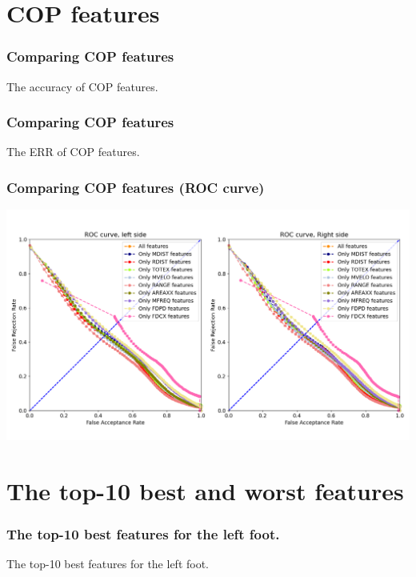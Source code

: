 \documentclass{beamer}
\begin{document}
\section{COP features}


\begin{frame}
\frametitle{Comparing COP features}
\tiny
\begin{table}
\centering
\captionsetup{labelformat=empty}
\caption{\small The accuracy of COP features.}
\label{tab:parameters condition}

\end{table}
\end{frame}

\begin{frame}
\frametitle{Comparing COP features}
\tiny
\begin{table}
\centering
\captionsetup{labelformat=empty}
\caption{\small The ERR of COP features.}
\label{tab:parameters condition}

\end{table}
\end{frame}


\begin{frame}
\centering
\frametitle{Comparing COP features (ROC curve)}
\includegraphics[scale=0.3]{Manuscripts/src/figures/feat.png}
\end{frame}




\section{The top-10 best and worst features}

\begin{frame}[shrink=10]
\frametitle{The top-10 best features for the left foot.}
\tiny
\begin{table}
\centering
\caption{\small The top-10 best features for the left foot.}

\end{table}
\end{frame}
\end{document}
